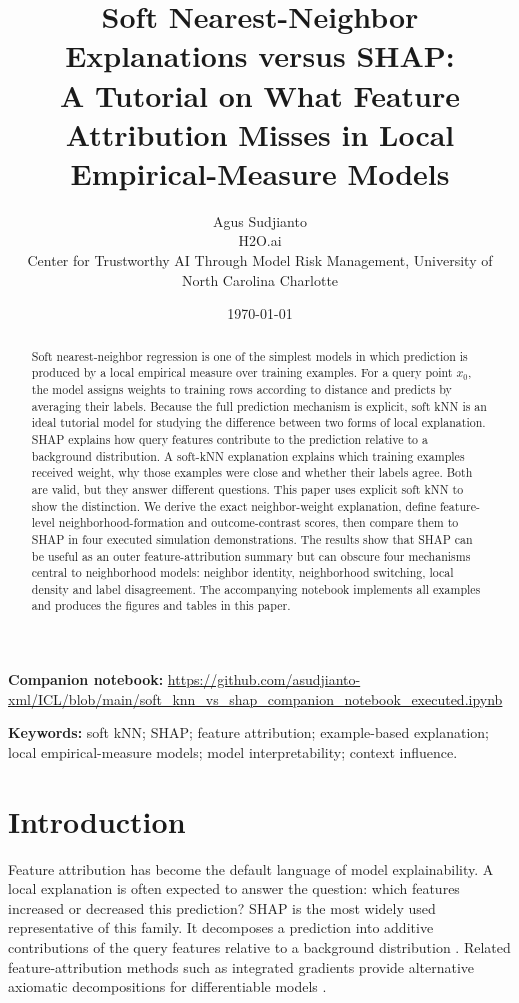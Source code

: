 \documentclass[11pt]{article}
\title{Soft Nearest-Neighbor Explanations versus SHAP:\\
A Tutorial on What Feature Attribution Misses in Local Empirical-Measure Models}
\author{Agus Sudjianto\\
\small H2O.ai\\
\small Center for Trustworthy AI Through Model Risk Management, University of North Carolina Charlotte}
\date{\today}
\newcommand{\1}{\mathbf{1}}
\begin{document}
\maketitle

\begin{abstract}
Soft nearest-neighbor regression is one of the simplest models in which prediction is produced by a local empirical measure over training examples. For a query point $x_0$, the model assigns weights to training rows according to distance and predicts by averaging their labels. Because the full prediction mechanism is explicit, soft kNN is an ideal tutorial model for studying the difference between two forms of local explanation. SHAP explains how query features contribute to the prediction relative to a background distribution. A soft-kNN explanation explains which training examples received weight, why those examples were close and whether their labels agree. Both are valid, but they answer different questions. This paper uses explicit soft kNN to show the distinction. We derive the exact neighbor-weight explanation, define feature-level neighborhood-formation and outcome-contrast scores, then compare them to SHAP in four executed simulation demonstrations. The results show that SHAP can be useful as an outer feature-attribution summary but can obscure four mechanisms central to neighborhood models: neighbor identity, neighborhood switching, local density and label disagreement. The accompanying notebook implements all examples and produces the figures and tables in this paper.
\end{abstract}

\noindent\textbf{Companion notebook:} \url{https://github.com/asudjianto-xml/ICL/blob/main/soft_knn_vs_shap_companion_notebook_executed.ipynb}

\noindent\textbf{Keywords:} soft kNN; SHAP; feature attribution; example-based explanation; local empirical-measure models; model interpretability; context influence.

\section{Introduction}

Feature attribution has become the default language of model explainability. A local explanation is often expected to answer the question: which features increased or decreased this prediction? SHAP is the most widely used representative of this family. It decomposes a prediction into additive contributions of the query features relative to a background distribution \citep{shapley1953value,lundberg2017unified}. Related feature-attribution methods such as integrated gradients provide alternative axiomatic decompositions for differentiable models \citep{sundararajan2017axiomatic}.
\end{document}
